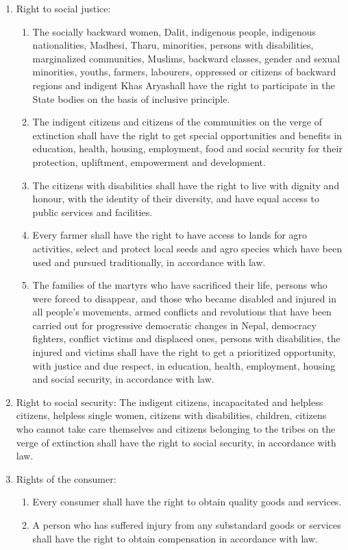 \begin{questions}
\begin{solution}
\begin{enumerate}
\item Right to social justice:
\begin{enumerate}
    \item The socially backward women, Dalit, indigenous people, indigenous nationalities, Madhesi, Tharu, minorities, persons with disabilities, marginalized communities, Muslims, backward classes, gender and sexual minorities, youths, farmers, labourers, oppressed or citizens of backward regions and indigent Khas Aryashall have the right to participate in the State bodies on the basis of inclusive principle.
    \item The indigent citizens and citizens of the communities on the verge of extinction shall have the right to get special opportunities and benefits in education, health, housing, employment, food and social security for their protection, upliftment, empowerment and development.
    \item The citizens with disabilities shall have the right to live with dignity and honour, with the identity of their diversity, and have equal access to public services and facilities.
    \item Every farmer shall have the right to have access to lands for agro activities, select and protect local seeds and agro species which have been used and pursued traditionally, in accordance with law.
    \item The families of the martyrs who have sacrificed their life, persons who were forced to disappear, and those who became disabled and injured in all people's movements, armed conflicts and revolutions that have been carried out for progressive democratic changes in Nepal, democracy fighters, conflict victims and displaced ones, persons with disabilities, the injured and victims shall have the right to get a prioritized opportunity, with justice and due respect, in education, health, employment, housing and social security, in accordance with law.
\end{enumerate}

\item Right to social security: The indigent citizens, incapacitated and helpless citizens, helpless single women, citizens with disabilities, children, citizens who cannot take care themselves and citizens belonging to the tribes on the verge of extinction shall have the right to social security, in accordance with law.

\item Rights of the consumer:
\begin{enumerate}
    \item Every consumer shall have the right to obtain quality goods and services.
    \item A person who has suffered injury from any substandard goods or services shall have the right to obtain compensation in accordance with law.
\end{enumerate}


\end{enumerate}
\end{solution}
\end{questions}
